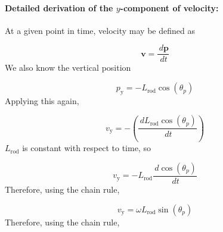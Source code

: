 \documentclass[12pt]{article}
\begin{document}
\paragraph{Detailed derivation of the $y$-component of velocity:}
\label{GD:velocityIYDeriv}
At a given point in time, velocity may be defined as

\begin{displaymath}
\symbf{v}=\frac{\,d\symbf{p}}{\,dt}
\end{displaymath}
We also know the vertical position

\begin{displaymath}
{p_{\text{y}}}=-{L_{\text{rod}}} \cos\left({θ_{p}}\right)
\end{displaymath}
Applying this again,

\begin{displaymath}
{v_{\text{y}}}=-\left(\frac{\,d{L_{\text{rod}}} \cos\left({θ_{p}}\right)}{\,dt}\right)
\end{displaymath}
${L_{\text{rod}}}$ is constant with respect to time, so

\begin{displaymath}
{v_{\text{y}}}=-{L_{\text{rod}}} \frac{\,d\cos\left({θ_{p}}\right)}{\,dt}
\end{displaymath}
Therefore, using the chain rule,

\begin{displaymath}
{v_{\text{y}}}=ω {L_{\text{rod}}} \sin\left({θ_{p}}\right)
\end{displaymath}
Therefore, using the chain rule,
\end{document}
